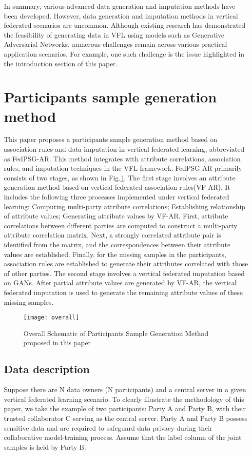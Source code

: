 \documentclass[final,1p,times]{elsarticle}
\begin{document}
In summary, various advanced data generation and imputation methods have been developed. However, data generation and imputation methods in vertical federated scenarios are uncommon. Although existing research has demonstrated the feasibility of generating data in VFL using models such as Generative Adversarial Networks, numerous challenges remain across various practical application scenarios. For example, one such challenge is the issue highlighted in the introduction section of this paper.

\section{Participants sample generation method}
\label{sec3}
This paper proposes a participants sample generation method based on association rules and data imputation in vertical federated learning, abbreviated as FedPSG-AR. This method integrates with attribute correlations, association rules, and imputation techniques in the VFL framework. FedPSG-AR primarily consists of two stages, as shown in Fig.\ref{fig:overall}. The first stage involves an attribute generation method based on vertical federated association rules(VF-AR). It includes the following three processes implemented under vertical federated learning: Computing multi-party attribute correlations; Establishing relationship of attribute values; Generating attribute values by VF-AR. First, attribute correlations between different parties are computed to construct a multi-party attribute correlation matrix. Next, a strongly correlated attribute pair is identified from the matrix, and the correspondences between their attribute values are established. Finally, for the missing samples in the participants, association rules are established to generate their attributes correlated with those of other parties. The second stage involves a vertical federated imputation based on GANs. After partial attribute values are generated by VF-AR, the vertical federated imputation is used to generate the remaining attribute values of these missing samples.
\begin{figure}[t]
	\centering 
	\texttt{[image: overall]}
	\caption{Overall Schematic of Participants Sample Generation Method proposed in this paper} 
	\label{fig:overall}
\end{figure}

\subsection{Data description}
\label{subsec31}
Suppose there are N data owners (N participants) and a central server in a given vertical federated learning scenario. To clearly illustrate the methodology of this paper, we take the example of two participants: Party A and Party B, with their trusted collaborator C serving as the central server. Party A and Party B possess sensitive data and are required to safeguard data privacy during their collaborative model-training process. Assume that the label column of the joint samples is held by Party B.
\end{document}

